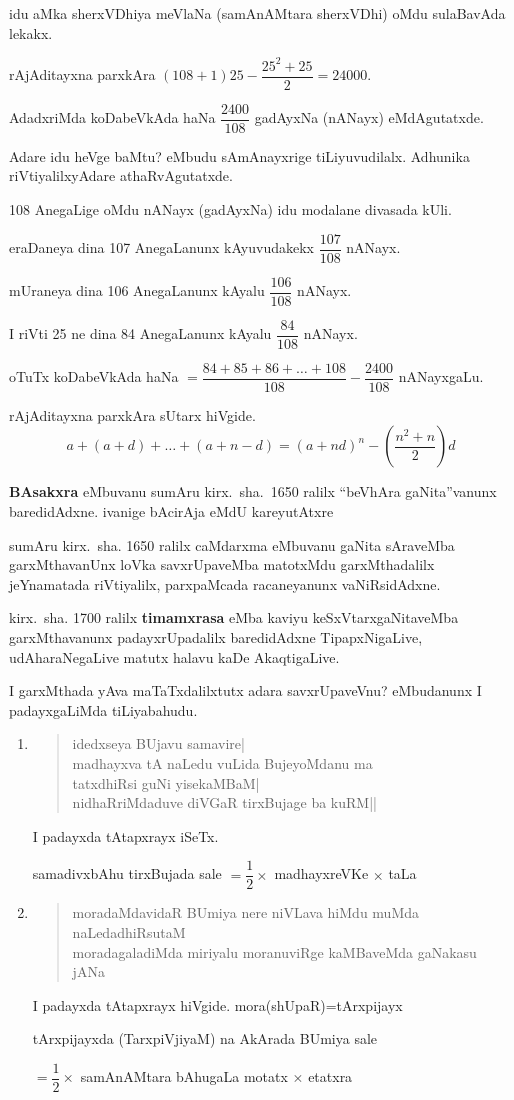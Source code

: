 idu aMka sherxVDhiya meVlaNa (samAnAMtara sherxVDhi) oMdu sulaBavAda lekakx.

rAjAditayxna parxkAra $(108+1)25-\dfrac{25^2+25}{2}=24000$.

AdadxriMda koDabeVkAda haNa $\dfrac{2400}{108}$ gadAyxNa (nANayx) eMdAgutatxde.

Adare idu heVge baMtu? eMbudu sAmAnayxrige tiLiyuvudilalx. Adhunika riVtiyalilxyAdare athaRvAgutatxde.

{\rm 108} AnegaLige oMdu nANayx (gadAyxNa) idu modalane divasada kUli.

eraDaneya dina {\rm 107} AnegaLanunx kAyuvudakekx $\dfrac{107}{108}$ nANayx.

mUraneya dina {\rm 106} AnegaLanunx kAyalu $\dfrac{106}{108}$ nANayx.

I riVti {\rm 25} ne dina {\rm 84} AnegaLanunx kAyalu $\dfrac{84}{108}$ nANayx.

oTuTx koDabeVkAda haNa $=\dfrac{84+85+86+\ldots+108}{108}-\dfrac{2400}{108}$ nANayxgaLu.

rAjAditayxna parxkAra sUtarx hiVgide.
$$
a+(a+d)+\ldots+(a+n-d)
=(a+nd)^n-(\dfrac{n^2+n}{2})d
$$

\textbf{BAsakxra} eMbuvanu sumAru kirx.~sha.~{\rm 1650} ralilx ``beVhAra gaNita''vanunx baredi\-dAdxne. ivanige bAcirAja eMdU kareyutAtxre 

sumAru kirx.~sha. {\rm 1650} ralilx caMdarxma eMbuvanu gaNita sAraveMba garxMthavanUnx loVka savxrUpaveMba matotxMdu garxMthadalilx jeYnamatada riVtiyalilx, parxpaMcada racaneyanunx vaNiRsidAdxne.

kirx.~sha. {\rm 1700} ralilx \textbf{timamxrasa} eMba kaviyu keSxVtarxgaNitaveMba garxMthavanunx padayxrUpa\-dalilx baredidAdxne TipapxNigaLive, udAharaNegaLive matutx halavu kaDe AkaqtigaLive.

I garxMthada yAva maTaTxdalilxtutx adara savxrUpaveVnu? eMbudanunx I padayxgaLiMda tiLiyabahudu.
\begin{enumerate}[\rm 1)]
\item 
\begin{verse}
idedxseya BUjavu samavire|\\
madhayxva tA naLedu vuLida BujeyoMdanu ma\\
tatxdhiRsi guNi yisekaMBaM|\\
nidhaRriMdaduve diVGaR tirxBujage ba kuRM||
\end{verse}
I padayxda tAtapxrayx iSeTx. 

samadivxbAhu tirxBujada sale $=\dfrac{1}{2}\times$ madhayxreVKe $\times$ taLa

\item 
\begin{verse}
moradaMdavidaR BUmiya nere niVLava hiMdu muMda naLe\-dadhiRsutaM\\
moradagaladiMda miriyalu moranuviRge kaMBaveMda gaNakasu jANa
\end{verse}

I padayxda tAtapxrayx hiVgide. \qquad mora(shUpaR)=tArxpijayx

tArxpijayxda (TarxpiVjiyaM) na AkArada BUmiya sale 

$=\dfrac{1}{2}\times$ samAnAMtara bAhugaLa motatx $\times$ etatxra
\end{enumerate}

